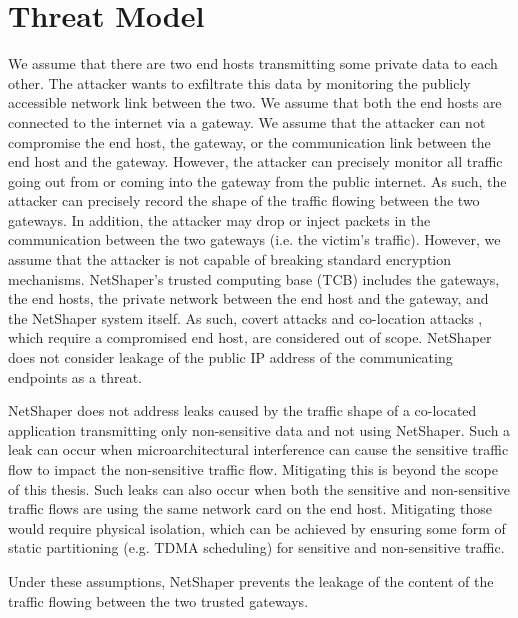 \section{Threat Model}
\label{sec:netshaper-threat-model}

We assume that there are two end hosts transmitting some private data to each other.
The attacker wants to exfiltrate this data by monitoring the publicly accessible network link between the two.
We assume that both the end hosts are connected to the internet via a gateway.
We assume that the attacker can not compromise the end host, the gateway, or the communication link between the end host and the gateway.
However, the attacker can precisely monitor all traffic going out from or coming into the gateway from the public internet. 
As such, the attacker can precisely record the shape of the traffic flowing between the two gateways.
In addition, the attacker may drop or inject packets in the communication between the two gateways (i.e. the victim's traffic).
However, we assume that the attacker is not capable of breaking standard encryption mechanisms.
NetShaper's trusted computing base (TCB) includes the gateways, the end hosts, the private network between the end host and the gateway, and the NetShaper system itself.
As such, covert attacks \cite{zhang2011predinteractive} and co-location attacks \cite{schuster2017beautyburst,mehta2022pacer}, which require a compromised end host, are considered out of scope.
NetShaper does not consider leakage of the public IP address of the communicating endpoints as a threat.

NetShaper does not address leaks caused by the traffic shape of a co-located application transmitting only non-sensitive data and not using NetShaper.
Such a leak can occur when microarchitectural interference can cause the sensitive traffic flow to impact the non-sensitive traffic flow. 
Mitigating this is beyond the scope of this thesis.
Such leaks can also occur when both the sensitive and non-sensitive traffic flows are using the same network card on the end host.
Mitigating those would require physical isolation, which can be achieved by ensuring some form of static partitioning (e.g. TDMA scheduling) for sensitive and non-sensitive traffic.

Under these assumptions, NetShaper prevents the leakage of the content of the traffic flowing between the two trusted gateways.